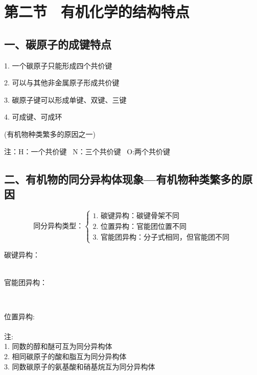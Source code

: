 \documentclass{book}
\begin{document}
\newpage
\section{第二节 \ 有机化学的结构特点}
\subsection{一、碳原子的成键特点}  

1. 一个碳原子只能形成四个共价键 \par
2. 可以与其他非金属原子形成共价键 \par
3. 碳原子键可以形成单键、双键、三键 \par
4. 可成键、可成环 \par
(有机物种类繁多的原因之一)

注：H：一个共价键 \ N：三个共价键 \ O:两个共价键
\newline \par
\subsection{二、有机物的同分异构体现象—有机物种类繁多的原因}
$$\text{同分异构类型：}
	\begin{cases}  \text{1. 碳键异构：碳键骨架不同} \\
						\text{2. 位置异构：官能团位置不同} \\
 						\text{3. 官能团异构：分子式相同，但官能团不同}
	\end{cases}$$
\newline  \par
碳键异构：\\
 \quad {} 
\\
\newline \par
官能团异构：\par
{} \quad   {}\\
\newline \par
位置异构: \\
 \quad {} \\

注:\\
1. 同数的醇和醚可互为同分异构体\\
2. 相同碳原子的酸和脂互为同分异构体\\
3. 同数碳原子的氨基酸和硝基烷互为同分异构体\\
\end{document}
